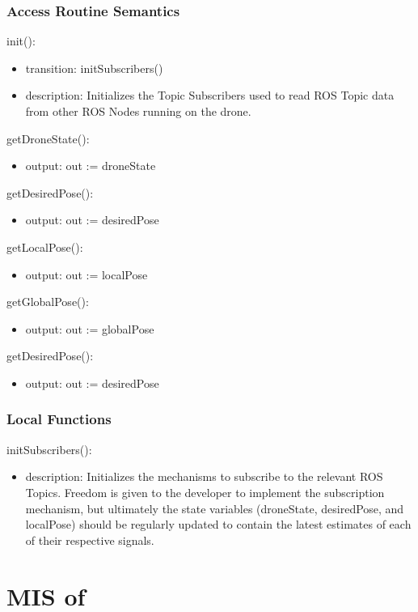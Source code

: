 \documentclass[12pt, titlepage]{article}
\begin{document}
\subsubsection{Access Routine Semantics}
\noindent init():
\begin{itemize}
\item transition: initSubscribers()
\item description: Initializes the Topic Subscribers used to read ROS Topic data from other ROS Nodes running on the drone.
\end{itemize}
\noindent getDroneState():
\begin{itemize}
\item output: out := droneState 
\end{itemize}
\noindent getDesiredPose():
\begin{itemize}
\item output: out := desiredPose 
\end{itemize}
\noindent getLocalPose():
\begin{itemize}
\item output: out := localPose 
\end{itemize}
\noindent getGlobalPose():
\begin{itemize}
\item output: out := globalPose 
\end{itemize}
\noindent getDesiredPose():
\begin{itemize}
\item output: out := desiredPose 
\end{itemize}
\subsubsection{Local Functions}
\noindent initSubscribers():
\begin{itemize}
\item description: Initializes the mechanisms to subscribe to the relevant ROS Topics. Freedom is given to the developer to implement the subscription mechanism, but ultimately the state variables (droneState, desiredPose, and localPose) should be regularly updated to contain the latest estimates of each of their respective signals.
\end{itemize}
\newpage



\section{MIS of } \label{MIS_VISION_APP} 
\end{document}
